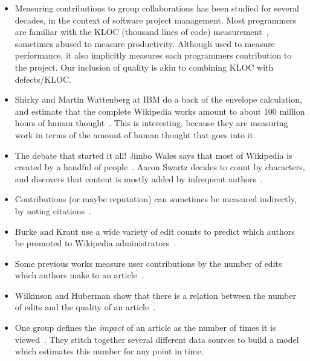 \begin{itemize}

\item Measuring contributions to group collaborations has been
	studied for several decades, in the context of
	software project management.
	Most programmers are familiar with the KLOC
	(thousand lines of code) measurement~\cite{MITRE1988, SLOC1992},
	sometimes abused to measure productivity.
	Although used to measure performance, it also
	implicitly measures each programmers contribution
	to the project. 
    Our inclusion of quality is akin
	to combining KLOC with defects/KLOC.

\item Shirky and Martin Wattenberg at IBM do a back of the
        envelope calculation, and estimate that the complete Wikipedia
	works amount to about 100 million hours of human
	thought~\cite{CognitiveSurplus2008}.
	This is interesting, because they are measuring work
	in terms of the amount of human thought that goes into it.

\item The debate that started it all!
	Jimbo Wales says that most of Wikipedia is created by
	a handful of people~\cite{Wales2005}.
	Aaron Swartz decides to count by characters,
	and discovers that content is mostly added
	by infrequent authors~\cite{Swartz2006}.

\item Contributions (or maybe reputation) can sometimes be measured indirectly,
	by noting citations~\cite{PageRank98,AckCounting2004,WikiMTWtrust06}.

\item Burke and Kraut use a wide variety of edit counts to predict
	which authors be promoted to Wikipedia administrators~\cite{AdministratorMop2008}.

\item Some previous works measure user contributions by the number
	of edits which authors make to an
	article~\cite{Wales2005,EditsEqQuality2007,Bourgeoisie2007,
	WikiDashboard2008,OrtegaBarahona2007,SteinHess2007}.

\item Wilkinson and Huberman show that there is a relation between
	the number of edits and the quality of an article~\cite{EditsEqQuality2007}.

\item One group defines the \textit{impact} of an article as the number
	of times it is viewed~\cite{WikiImpact2007}.  They stitch together
	several different data sources to build a model which estimates this number
	for any point in time.  


\end{itemize}
